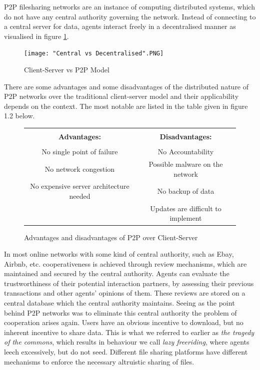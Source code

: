 \noindent{}P2P filesharing networks are an instance of computing distributed systems, which do not have any central authority governing the network. Instead of connecting to a central server for data, agents interact freely in a decentralised manner as visualised in figure \ref{fig:Client-Server vs P2P Model}. \vspace{1em}\\


\begin{figure}[H]
\begin{center}
\texttt{[image: "Central vs Decentralised".PNG]}
\caption{Client-Server vs P2P Model}
\label{fig:Client-Server vs P2P Model}
\end{center}
\end{figure}

\noindent{}There are some advantages and some disadvantages of the distributed nature of P2P networks over the traditional client-server model and their applicability depends on the context. The most notable are listed in the table given in figure 1.2 below.\vspace{1em}\\

\begin{figure}[H]
\begin{center}
\begin{tabular}{|c|c|}
\hline & \\[-0.7ex] \textbf{Advantages:} & \textbf{Disadvantages:} \\[1.5ex] \hline & \\[0.7ex]
No single point of failure & No Accountability \\
No network congestion & Possible malware on the network \\
No expensive server architecture needed  & No backup of data \\
 & Updates are difficult to implement \\[1ex] 
\hline
\end{tabular}
\label{fig:Pros and Cons of P2P}
\caption{Advantages and disadvantages of P2P over Client-Server}
\end{center}
\end{figure}

\noindent{}In most online networks with some kind of central authority, such as Ebay, Airbnb, etc. cooperativeness is achieved through review mechanisms, which are maintained and secured by the central authority. Agents can evaluate the trustworthiness of their potential interaction partners, by assessing their previous transactions and other agents' opinions of them. These reviews are stored on a central database which the central authority maintains. Seeing as the point behind P2P networks was to eliminate this central authority the problem of cooperation arises again. Users have an obvious incentive to download, but no inherent incentive to share data. This is what we referred to earlier as {\it the tragedy of the commons}, which results in behaviour we call {\it lazy freeriding}, where agents leech excessively, but do not seed. Different file sharing platforms have different mechanisms to enforce the necessary altruistic sharing of files. \vspace{1em}\\


